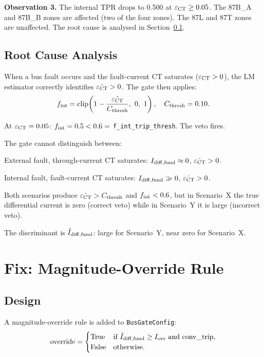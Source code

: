 \documentclass[12pt,a4paper]{article}
\newcommand{\fint}{f_{\rm int}}
\newcommand{\epsct}{\varepsilon_{\rm CT}}
\begin{document}
\noindent\textbf{Observation 3.}  The internal TPR drops to 0.500 at
$\epsct \geq 0.05$.  The 87B\_A and 87B\_B zones are affected (two of the
four zones).  The 87L and 87T zones are unaffected.  The root cause is
analysed in Section~\ref{sec:analysis}.

\subsection{Root Cause Analysis}
\label{sec:analysis}

When a bus fault occurs and the fault-current CT saturates ($\epsct > 0$),
the LM estimator correctly identifies $\hat{\epsct} > 0$.  The gate then
applies:
\begin{equation}
  \fint = \mathrm{clip}\!\left(1 - \frac{\hat{\epsct}}{C_{\rm thresh}},\ 0,\ 1\right),
  \quad C_{\rm thresh} = 0.10.
\end{equation}

At $\epsct = 0.05$: $\fint = 0.5 < 0.6 = $ \texttt{f\_int\_trip\_thresh}.
The veto fires.

The gate cannot distinguish between:
\begin{description}[noitemsep]
  \item[Scenario X] External fault, through-current CT saturates:
    $I_{\rm diff,fund} \approx 0$, $\hat{\epsct} > 0$.
  \item[Scenario Y] Internal fault, fault-current CT saturates:
    $I_{\rm diff,fund} \gg 0$, $\hat{\epsct} > 0$.
\end{description}

Both scenarios produce $\hat{\epsct} > C_{\rm thresh}$ and $\fint < 0.6$,
but in Scenario~X the true differential current is zero (correct veto)
while in Scenario~Y it is large (incorrect veto).

The discriminant is $\hat{I}_{\rm diff,fund}$: large for Scenario~Y,
near zero for Scenario~X.

\section{Fix: Magnitude-Override Rule}

\subsection{Design}

A magnitude-override rule is added to \texttt{BusGateConfig}:
\begin{equation}
  \mathrm{override} =
  \begin{cases}
    \text{True} & \text{if }
      \hat{I}_{\rm diff,fund} \geq I_{\rm ovr} \text{ and } \mathrm{conv\_trip},\\
    \text{False} & \text{otherwise.}
  \end{cases}
  \label{eq:override}
\end{equation}
\end{document}
